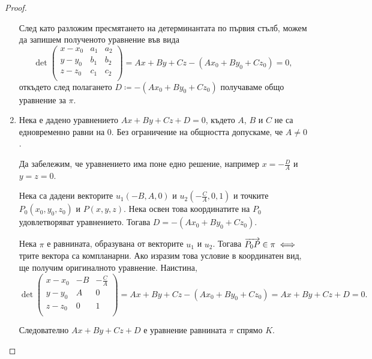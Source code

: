 \documentclass[numbers=endperiod, DIV=15, bibliography=totocnumbered]{scrartcl}
\begin{document}
\begin{proof}
\begin{enumerate}
    След като разложим пресмятането на детерминантата по първия стълб, можем да запишем полученото уравнение във вида
    \begin{displaymath}
      \det \begin{pmatrix}
        x - x_0 & a_1 & a_2 \\
        y - y_0 & b_1 & b_2 \\
        z - z_0 & c_1 & c_2 \\
      \end{pmatrix}
      =
      Ax + By + Cz - (Ax_0 + By_0 + Cz_0) = 0,
    \end{displaymath}
    откъдето след полагането $D \coloneqq - (Ax_0 + By_0 + Cz_0)$ получаваме общо уравнение за $\pi$.

    \item Нека е дадено уравнението $Ax + By + Cz + D = 0$, където $A$, $B$ и $C$ не са едновременно равни на $0$. Без ограничение на общността допускаме, че $A \neq 0$.

    Да забележим, че уравнението има поне едно решение, например $x = -\frac D A$ и $y = z = 0$.

    Нека са дадени векторите $u_1(-B, A, 0)$ и $u_2 \left(-\frac C A, 0, 1 \right)$ и точките $P_0(x_0, y_0, z_0)$ и $P(x, y, z)$. Нека освен това координатите на $P_0$ удовлетворяват уравнението. Тогава $D = -(Ax_0 + By_0 + Cz_0)$.

    Нека $\pi$ е равнината, образувана от векторите $u_1$ и $u_2$. Тогава $\overrightarrow{P_0 P} \in \pi \iff$ трите вектора са компланарни. Ако изразим това условие в координатен вид, ще получим оригиналното уравнение. Наистина,
    \begin{displaymath}
      \det \begin{pmatrix}
        x - x_0 & -B & -\frac C A \\
        y - y_0 & A & 0 \\
        z - z_0 & 0 & 1 \\
      \end{pmatrix}
      =
      Ax + By + Cz - (Ax_0 + By_0 + Cz_0) = Ax + By + Cz + D = 0.
    \end{displaymath}

    Следователно $Ax + By + Cz + D$ е уравнение равнината $\pi$ спрямо $K$.
  \end{enumerate}
\end{proof}
\end{document}
